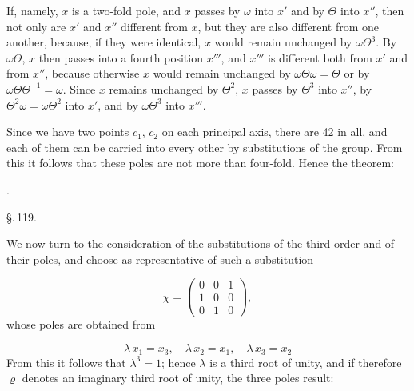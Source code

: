 If, namely, $x$ is a two-fold pole, and $x$ passes by $\omega$ into $x'$ and by $\Theta$ into $x''$, then not only are $x'$ and $x''$ different from $x$, but they are also different from one another, because, if they were identical, $x$ would remain unchanged by $\omega\Theta^3$. By $\omega\Theta$, $x$ then passes into a fourth position $x'''$, and $x'''$ is different both from $x'$ and from $x''$, because otherwise $x$ would remain unchanged by $\omega\Theta\omega = \Theta$ or by $\omega\Theta\Theta^{-1} = \omega$. Since $x$ remains unchanged by $\Theta^2$, $x$ passes by $\Theta^3$ into $x''$, by $\Theta^2\omega = \omega\Theta^2$ into $x'$, and by $\omega\Theta^3$ into $x'''$.

Since we have two points $c_1$, $c_2$ on each principal axis, there are 42 in all, and each of them can be carried into every other by substitutions of the group. From this it follows that these poles are not more than four-fold. Hence the theorem:

.\ 

\begin{center}
\S.\,119.

\end{center}

We now turn to the consideration of the substitutions of the third order and of their poles, and choose as representative of such a substitution

\[
\chi = \begin{pmatrix} 0 & 0 & 1\\ 1 & 0 & 0\\ 0 & 1 & 0 \end{pmatrix},
\]
whose poles are obtained from

\[
\lambda\,x_1 = x_3, \quad \lambda\,x_2 = x_1, \quad \lambda\,x_3 = x_2
\]
From this it follows that $\lambda^3 = 1$; hence $\lambda$ is a third root of unity, and if therefore $\varrho$ denotes an imaginary third root of unity, the three poles result:

